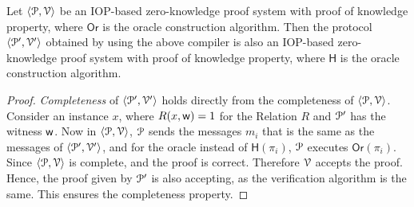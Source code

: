 \begin{lemma}\label{lemma:compiler}
	Let $\langle \mathcal{P}, \mathcal{V} \rangle$ be an IOP-based zero-knowledge proof system with proof of knowledge property, where $\mathsf{Or}$ is the oracle construction algorithm. Then the protocol $\langle \mathcal{P}', \mathcal{V}' \rangle$ obtained by using the above compiler is also an IOP-based zero-knowledge proof system with proof of knowledge property, where $\mathsf{H}$ is the oracle construction algorithm.
\end{lemma}
\begin{proof}
	
%	
%	
	
	
	
	
	\textit{Completeness} of $\langle \mathcal{P}', \mathcal{V}' \rangle$ holds directly from the completeness of $\langle \mathcal{P}, \mathcal{V} \rangle$. Consider an instance $x$, where $R(x,\mathsf{w}) = 1$ for the Relation $R$ and $\mathcal{P}'$ has the witness $\mathsf{w}$. 
	Now in $\langle \mathcal{P}, \mathcal{V} \rangle$, $\mathcal{P}$ sends the messages $m_i$ that is the same as the messages of $\langle \mathcal{P}', \mathcal{V}' \rangle$, and for the oracle instead of $\mathsf{H}(\pi_i)$, $\mathcal{P}$ executes $\mathsf{Or}(\pi_i)$. Since $\langle \mathcal{P}, \mathcal{V} \rangle$ is complete, and the proof is correct. Therefore $\mathcal{V}$ accepts the proof. Hence, the proof given by $\mathcal{P}'$ is also accepting, as the verification algorithm is the same. This ensures the completeness property.
	

\end{proof}
